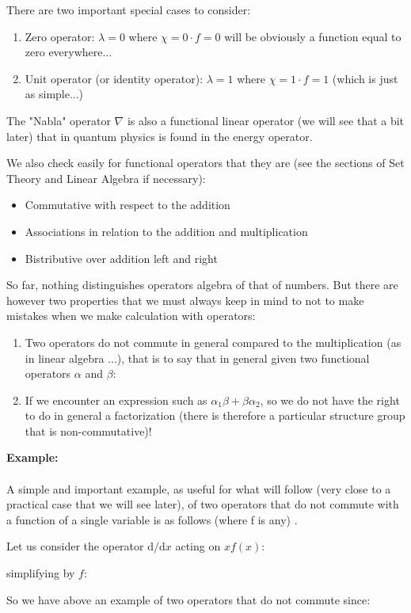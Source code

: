 	There are two important special cases to consider:
	\begin{enumerate}
		\item Zero operator: $\lambda=0$ where $\chi=0\cdot f=0$ will be obviously a function equal to zero everywhere...

		\item Unit operator (or identity operator): $\lambda=1$ where $\chi=1\cdot f=1$ (which is just as simple...)
	\end{enumerate}
	\begin{tcolorbox}[title=Remark,colframe=black,arc=10pt]
	The "Nabla" operator $\nabla$ is also a functional linear operator (we will see that a bit later) that in quantum physics is found in the energy operator.
	\end{tcolorbox}
	We also check easily for functional operators that they are (see the sections of Set Theory and Linear Algebra if necessary):
	\begin{itemize}
		\item Commutative with respect to the addition
	
		\item Associations in relation to the addition and multiplication
		
		\item Bistributive over addition left and right
	\end{itemize}
	So far, nothing distinguishes operators algebra of that of numbers. But there are however two properties that we must always keep in mind to not to make mistakes when we make calculation with operators:
	\begin{enumerate}
		\item Two operators do not commute in general compared to the multiplication (as in linear algebra ...), that is to say that in general given two functional operators $\alpha$ and $\beta$:
		

		\item If we encounter an expression such as $\alpha_1\beta+\beta\alpha_2$, so we do not have the right to do in general a factorization (there is therefore a particular structure group that is non-commutative)!
	\end{enumerate}
	\begin{tcolorbox}[colframe=black,colback=white,sharp corners]
	\textbf{{\Large {}}Example:}\\\\
	A simple and important example, as useful for what will follow (very close to a practical case that we will see later), of two operators that do not commute with a function of a single variable is as follows (where f is any) . 

	Let us consider the operator $\mathrm{d}/\mathrm{d}x$ acting on $xf(x)$:
	
	simplifying by $f$:
	
	So we have above an example of two operators that do not commute since:
	
	\end{tcolorbox}
